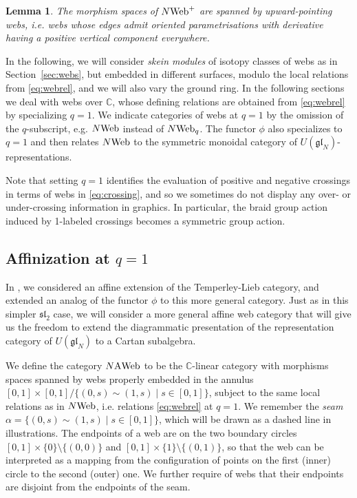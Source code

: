 \documentclass[11pt]{article}
\newtheorem{lemma}[theo]{Lemma}
\theoremstyle{definition}
\numberwithin{equation}{section}
\newcommand{\slnn}[1]{\mf{sl}_{#1}}
\newcommand{\glnn}[1]{\mf{gl}_{#1}}
\def\mf{\mathfrak}
\def\C{{\mathbb C}}
\newcommand{\cat}[1]{\ensuremath{\mbox{\bfseries {\upshape {#1}}}}}
\newcommand{\Web}[1][]{#1\cat{Web}}
\newcommand{\Webp}[1][]{#1\cat{Web}^{+}}
\newcommand{\Webq}[1][]{#1\cat{Web}_{q}}
\newcommand{\AWeb}[1][]{#1\cat{A}\cat{Web}}
\begin{document}
\begin{lemma}\label{lem:upward} The morphism spaces of $\Webp[N]$ are spanned by
upward-pointing webs, i.e. webs whose edges admit oriented parametrisations with
derivative having a positive vertical component everywhere.
\end{lemma} 
  
In the following, we will consider \emph{skein modules} of isotopy classes of
webs as in Section~\ref{sec:webs}, but embedded in different surfaces, modulo
the local relations from \eqref{eq:webrel}, and we will also vary the ground
ring. In the following sections we deal with webs over $\C$, whose defining
relations are obtained from \eqref{eq:webrel} by specializing $q=1$. We indicate
categories of webs at $q=1$ by the omission of the $q$-subscript, e.g. $\Web[N]$
instead of $\Webq[N]$. The functor $\phi$ also specializes to $q=1$ and then
relates $\Web[N]$ to the symmetric monoidal category of
$U(\glnn{N})$-representations.

Note that setting $q=1$ identifies the evaluation of positive and negative crossings in terms of webs in \eqref{eq:crossing}, and so we sometimes do not display any over- or under-crossing information in graphics. In particular, the braid group action induced by 1-labeled crossings becomes a symmetric group action.

  
\subsection{Affinization at \texorpdfstring{$q=1$}{q=1}}
In \cite{QW}, we considered an affine extension of the Temperley-Lieb category, and extended an analog of the functor $\phi$ to this more general category. Just as in this simpler $\slnn{2}$ case, we will consider a more general affine web category that will give us the freedom to extend the diagrammatic presentation of the representation category of $U(\glnn{N})$ to a Cartan subalgebra.


We define the category $\AWeb[N]$ to be the $\C$-linear category with morphisms
spaces spanned by webs properly embedded in the annulus $[0,1]\times
[0,1]/\{(0,s)\sim (1,s)\mid s\in [0,1]\}$, subject to the same local relations
as in $\Web[N]$, i.e. relations \eqref{eq:webrel} at $q=1$. We remember the
\textit{seam} $\alpha=\{(0,s)\sim (1,s)\mid s\in [0,1]\}$, which will be drawn
as a dashed line in illustrations. The endpoints of a web are on the two
boundary circles $[0,1]\times \{0\}\setminus\{(0,0)\}$ and $[0,1]\times
\{1\}\setminus\{(0,1)\} $, so that the web can be interpreted as a mapping
from the configuration of points on the first (inner) circle to the second (outer) one. We further require of webs that their
endpoints are disjoint from the endpoints of the seam.
\end{document}
